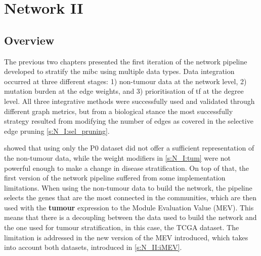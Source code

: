 
\chapter{Network II} \label{s:N_II}


\vspace{3mm}
\vspace{3mm}


\section{Overview}

The previous two chapters presented the first iteration of the network pipeline developed to stratify the \acrfull{mibc} using multiple data types. Data integration occurred at three different stages: 1) non-tumour data at the network level, 2) mutation burden at the edge weights, and 3) prioritisation of \acrfull{tf} at the degree level. All three integrative methods were successfully used and validated through different graph metrics, but from a biological stance the most successfully strategy resulted from modifying the number of edges as covered in the selective edge pruning \cref{s:N_I:sel_pruning}.


 showed that using only the P0 dataset did not offer a sufficient representation of the non-tumour data, while the weight modifiers in \cref{s:N_I:tum} were not powerful enough to make a change in disease stratification. On top of that, the first version of the network pipeline suffered from some implementation limitations. When using the non-tumour data to build the network, the pipeline selects the genes that are the most connected in the communities, which are then used with the \textbf{tumour} expression to the Module Evaluation Value (MEV). This means that there is a decoupling between the data used to build the network and the one used for tumour stratification, in this case, the TCGA dataset. The limitation is addressed in the new version of the MEV introduced, which takes into account both datasets, introduced in \cref{s:N_II:iMEV}.



